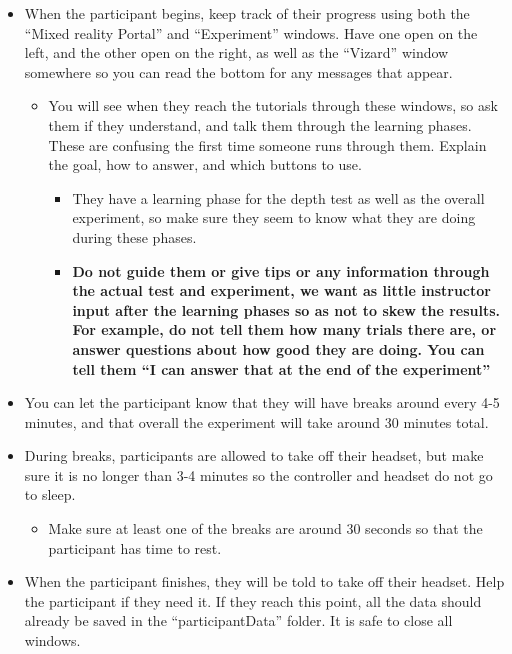 \documentclass[
]{article}
\providecommand{\tightlist}{%
  \setlength{\itemsep}{0pt}\setlength{\parskip}{0pt}}
\begin{document}
\begin{itemize}
\tightlist
\item
  When the participant begins, keep track of their progress using both
  the ``Mixed reality Portal'' and ``Experiment'' windows. Have one open
  on the left, and the other open on the right, as well as the
  ``Vizard'' window somewhere so you can read the bottom for any
  messages that appear.

  \begin{itemize}
  \tightlist
  \item
    You will see when they reach the tutorials through these windows, so
    ask them if they understand, and talk them through the learning
    phases. These are confusing the first time someone runs through
    them. Explain the goal, how to answer, and which buttons to use.

    \begin{itemize}
    \tightlist
    \item
      They have a learning phase for the depth test as well as the
      overall experiment, so make sure they seem to know what they are
      doing during these phases.
    \item
      \textbf{Do not guide them or give tips or any information through
      the actual test and experiment, we want as little instructor input
      after the learning phases so as not to skew the results. For
      example, do not tell them how many trials there are, or answer
      questions about how good they are doing. You can tell them ``I can
      answer that at the end of the experiment''}
    \end{itemize}
  \end{itemize}
\item
  You can let the participant know that they will have breaks around
  every 4-5 minutes, and that overall the experiment will take around 30
  minutes total.
\item
  During breaks, participants are allowed to take off their headset, but
  make sure it is no longer than 3-4 minutes so the controller and
  headset do not go to sleep.

  \begin{itemize}
  \tightlist
  \item
    Make sure at least one of the breaks are around 30 seconds so that
    the participant has time to rest.
  \end{itemize}
\item
  When the participant finishes, they will be told to take off their
  headset. Help the participant if they need it. If they reach this
  point, all the data should already be saved in the ``participantData''
  folder. It is safe to close all windows.


\end{itemize}
\end{document}
